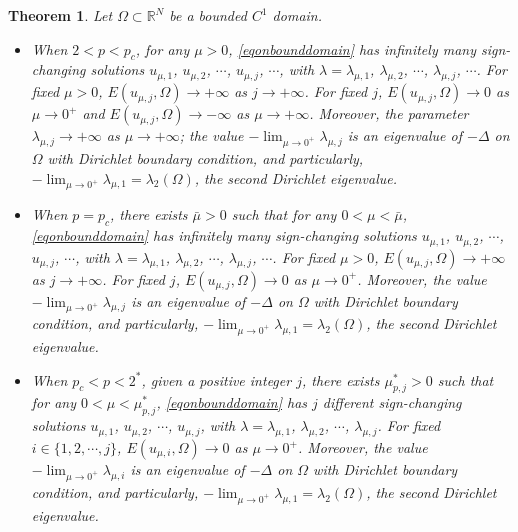 \documentclass[10pt,a4paper]{article}
\newtheorem{theorem}{Theorem}[section]
\theoremstyle{definition} \theoremstyle{remark}
\numberwithin{equation}{section}
\newcommand{\R}{\mathbb{R}}
\newcommand{\la}{\lambda}
\begin{document}
\begin{theorem} \label{thmsmall}
	Let $\Omega \subset \R^N$ be a bounded $C^1$ domain.
	\begin{itemize}
		\item[(i)] When $2 < p < p_c$, for any $\mu > 0$, \eqref{eqonbounddomain} has infinitely many sign-changing solutions $u_{\mu,1}$, $u_{\mu,2}$, $\cdots$, $u_{\mu,j}$, $\cdots$, with $\la = \la_{\mu,1}$, $\la_{\mu,2}$, $\cdots$, $\la_{\mu,j}$, $\cdots$.
		For fixed $\mu > 0$, $E(u_{\mu,j},\Omega) \to +\infty$ as $j \to +\infty$. For fixed $j$, $E(u_{\mu,j},\Omega) \to 0$ as $\mu \to 0^+$ and $E(u_{\mu,j},\Omega) \to -\infty$ as $\mu \to +\infty$. Moreover, the parameter $\displaystyle \la_{\mu,j} \to +\infty$ as $\mu \to +\infty$; the value $\displaystyle -\lim_{\mu \to 0^+}\la_{\mu,j}$ is an eigenvalue of $-\Delta$ on $\Omega$ with Dirichlet boundary condition, and particularly, $\displaystyle -\lim_{\mu \to 0^+}\la_{\mu,1} = \la_2(\Omega)$, the second Dirichlet eigenvalue.
		\item[(ii)] When $p = p_c$, there exists $\bar \mu > 0$ such that for any $0 < \mu < \bar \mu$, \eqref{eqonbounddomain} has infinitely many sign-changing solutions $u_{\mu,1}$, $u_{\mu,2}$, $\cdots$, $u_{\mu,j}$, $\cdots$, with $\la = \la_{\mu,1}$, $\la_{\mu,2}$, $\cdots$, $\la_{\mu,j}$, $\cdots$. For fixed $\mu > 0$, $E(u_{\mu,j},\Omega) \to +\infty$ as $j \to +\infty$. For fixed $j$, $E(u_{\mu,j},\Omega) \to 0$ as $\mu \to 0^+$. Moreover, the value $-\lim_{\mu \to 0^+}\la_{\mu,j}$ is an eigenvalue of $-\Delta$ on $\Omega$ with Dirichlet boundary condition, and particularly, $\displaystyle -\lim_{\mu \to 0^+}\la_{\mu,1} = \la_2(\Omega)$, the second Dirichlet eigenvalue.
		\item[(iii)] When $p_c < p < 2^*$, given a positive integer $j$, there exists $\mu^*_{p,j} > 0$ such that for any $0 < \mu < \mu^*_{p,j}$, \eqref{eqonbounddomain} has $j$ different sign-changing solutions $u_{\mu,1}$, $u_{\mu,2}$, $\cdots$, $u_{\mu,j}$, with $\la = \la_{\mu,1}$, $\la_{\mu,2}$, $\cdots$, $\la_{\mu,j}$. For fixed $i \in \{1,2,\cdots,j\}$, $E(u_{\mu,i},\Omega) \to 0$ as $\mu \to 0^+$. Moreover, the value $\displaystyle -\lim_{\mu \to 0^+}\la_{\mu,i}$ is an eigenvalue of $-\Delta$ on $\Omega$ with Dirichlet boundary condition, and particularly, $\displaystyle -\lim_{\mu \to 0^+}\la_{\mu,1} = \la_2(\Omega)$, the second Dirichlet eigenvalue.
	\end{itemize}
\end{theorem}
\end{document}
